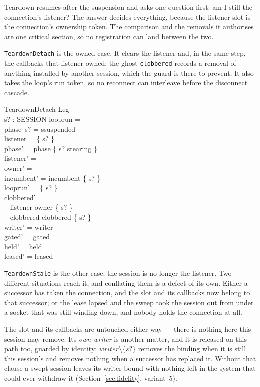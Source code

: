 \documentclass[a4paper,10pt,fleqn]{article}
\begin{document}
Teardown resumes after the suspension and asks one question first: am I
still the connection's listener?  The answer decides everything, because
the listener slot is the connection's ownership token.  The comparison
and the removals it authorises are one critical section, so no
registration can land between the two.

\texttt{TeardownDetach} is the owned case.  It clears the listener and,
in the same step, the callbacks that listener owned; the ghost
\texttt{clobbered} records a removal of anything installed by another
session, which the guard is there to prevent.  It also takes the loop's
run token, so no reconnect can interleave before the disconnect cascade.

\begin{schema}{TeardownDetach}
  \Delta Leg \\
  s? : SESSION
\where
  looprun = \emptyset \\
  phase~s? = ssuspended \\
  listener = \{ s? \} \\
  phase' = phase \oplus \{ s? \mapsto stearing \} \\
  listener' = \emptyset \\
  owner' = \emptyset \\
  incumbent' = incumbent \setminus \{ s? \} \\
  looprun' = \{ s? \} \\
  clobbered' = \\
  \quad~ \IF listener \cup \ran owner \subseteq \{ s? \} \\
  \quad~ \THEN clobbered \ELSE clobbered \cup \{ s? \} \\
  writer' = writer \\
  gated' = gated \\
  held' = held \\
  leased' = leased
\end{schema}

\texttt{TeardownStale} is the other case: the session is no longer the
listener.  Two different situations reach it, and conflating them is a
defect of its own.  Either a successor has taken the connection, and the
slot and its callbacks now belong to that successor; or the lease
lapsed and the sweep took the session out from under a socket that was
still winding down, and nobody holds the connection at all.

The slot and its callbacks are untouched either way --- there is nothing
here this session may remove.  Its \emph{own writer} is another matter,
and it is released on this path too, guarded by identity: $writer
\setminus \{ s? \}$ removes the binding when it is still this session's
and removes nothing when a successor has replaced it.  Without that
clause a swept session leaves its writer bound with nothing left in the
system that could ever withdraw it (Section~\ref{sec:fidelity},
variant~5).
\end{document}

